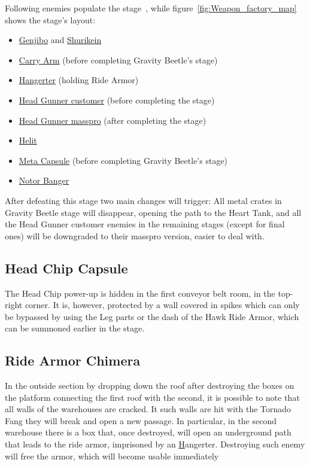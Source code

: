Following enemies populate the stage~\cite{wiki:Weapon_factory}, while figure~\ref{fig:Weapon_factory_map} shows the stage's layout:
\begin{itemize}
\item \hyperlink{miniboss:Genjibo}{Genjibo} and \hyperlink{miniboss:Shurikein}{Shurikein}
\item \hyperlink{enem:Carry_Arm}{Carry Arm} (before completing Gravity Beetle's stage)
\item \hyperlink{enem:Hangerter}{Hangerter} (holding Ride Armor)
\item \hyperlink{enem:Head_Gunner_customer}{Head Gunner customer} (before completing the stage)
\item \hyperlink{enem:Head_Gunner_masspro}{Head Gunner masspro} (after completing the stage)
\item \hyperlink{enem:Helit}{Helit}
\item \hyperlink{enem:Meta_Capsule}{Meta Capsule} (before completing Gravity Beetle's stage)
\item \hyperlink{enem:Notor_Banger}{Notor Banger}
\end{itemize}

After defeating this stage two main changes will trigger: All metal crates in Gravity Beetle stage will disappear, opening the path to the Heart Tank, and all the Head Gunner customer enemies in the remaining stages (except for final ones) will be downgraded to their masspro version, easier to deal with.

\subsection{Head Chip Capsule}
The Head Chip power-up is hidden in the first conveyor belt room, in the top-right corner. It is, however, protected by a wall covered in spikes which can only be bypassed by using the Leg parts or the dash of the Hawk Ride Armor, which can be summoned earlier in the stage.

\subsection{Ride Armor Chimera}
In the outside section by dropping down the roof after destroying the boxes on the platform connecting the first roof with the second, it is possible to note that all walls of the warehouses are cracked. It such walls are hit with the Tornado Fang they will break and open a new passage. In particular, in the second warehouse there is a box that, once destroyed, will open an underground path that leads to the ride armor, imprisoned by an \hyperlink{enem:Hangerter}Hangerter. Destroying such enemy will free the armor, which will become usable immediately

